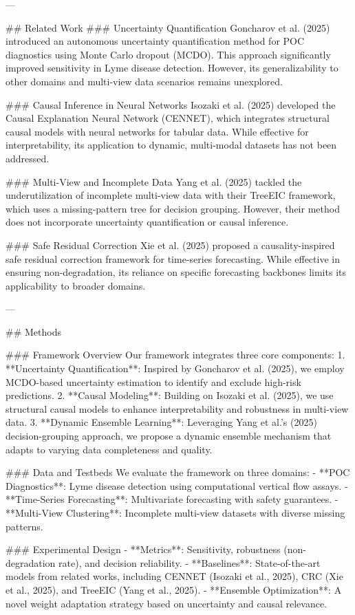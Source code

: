 ---

## Related Work
### Uncertainty Quantification
Goncharov et al. (2025) introduced an autonomous uncertainty quantification method for POC diagnostics using Monte Carlo dropout (MCDO). This approach significantly improved sensitivity in Lyme disease detection. However, its generalizability to other domains and multi-view data scenarios remains unexplored.

### Causal Inference in Neural Networks
Isozaki et al. (2025) developed the Causal Explanation Neural Network (CENNET), which integrates structural causal models with neural networks for tabular data. While effective for interpretability, its application to dynamic, multi-modal datasets has not been addressed.

### Multi-View and Incomplete Data
Yang et al. (2025) tackled the underutilization of incomplete multi-view data with their TreeEIC framework, which uses a missing-pattern tree for decision grouping. However, their method does not incorporate uncertainty quantification or causal inference.

### Safe Residual Correction
Xie et al. (2025) proposed a causality-inspired safe residual correction framework for time-series forecasting. While effective in ensuring non-degradation, its reliance on specific forecasting backbones limits its applicability to broader domains.

---

## Methods

### Framework Overview
Our framework integrates three core components:
1. **Uncertainty Quantification**: Inspired by Goncharov et al. (2025), we employ MCDO-based uncertainty estimation to identify and exclude high-risk predictions.
2. **Causal Modeling**: Building on Isozaki et al. (2025), we use structural causal models to enhance interpretability and robustness in multi-view data.
3. **Dynamic Ensemble Learning**: Leveraging Yang et al.'s (2025) decision-grouping approach, we propose a dynamic ensemble mechanism that adapts to varying data completeness and quality.

### Data and Testbeds
We evaluate the framework on three domains:
- **POC Diagnostics**: Lyme disease detection using computational vertical flow assays.
- **Time-Series Forecasting**: Multivariate forecasting with safety guarantees.
- **Multi-View Clustering**: Incomplete multi-view datasets with diverse missing patterns.

### Experimental Design
- **Metrics**: Sensitivity, robustness (non-degradation rate), and decision reliability.
- **Baselines**: State-of-the-art models from related works, including CENNET (Isozaki et al., 2025), CRC (Xie et al., 2025), and TreeEIC (Yang et al., 2025).
- **Ensemble Optimization**: A novel weight adaptation strategy based on uncertainty and causal relevance.


